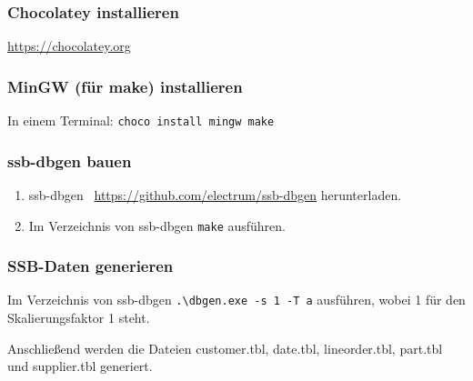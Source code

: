 \subsubsection{Chocolatey installieren}
\url{https://chocolatey.org}
\subsubsection{MinGW (für make) installieren}
In einem Terminal:
\lstinline{choco install mingw make}
\subsubsection{ssb-dbgen bauen}
\begin{enumerate}
    \item ssb-dbgen~\cite{phillips_electrumssb-dbgen_2023} \url{https://github.com/electrum/ssb-dbgen} herunterladen.
    \item Im Verzeichnis von ssb-dbgen \lstinline{make} ausführen.
\end{enumerate}
\subsubsection{\acs{SSB}-Daten generieren}
Im Verzeichnis von ssb-dbgen \lstinline{.\dbgen.exe -s 1 -T a} ausführen, wobei 1 für den Skalierungsfaktor 1 steht.

Anschließend werden die Dateien customer.tbl, date.tbl, lineorder.tbl, part.tbl und supplier.tbl generiert.

